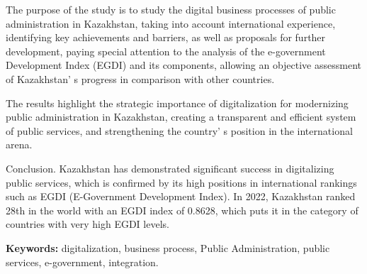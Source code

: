 The purpose of the study is to study the digital business processes of
public administration in Kazakhstan, taking into account international
experience, identifying key achievements and barriers, as well as
proposals for further development, paying special attention to the
analysis of the e-government Development Index (EGDI) and its
components, allowing an objective assessment of
Kazakhstan' s progress in comparison with other
countries.

The results highlight the strategic importance of digitalization for
modernizing public administration in Kazakhstan, creating a transparent
and efficient system of public services, and strengthening the
country' s position in the international arena.

Conclusion. Kazakhstan has demonstrated significant success in
digitalizing public services, which is confirmed by its high positions
in international rankings such as EGDI (E-Government Development Index).
In 2022, Kazakhstan ranked 28th in the world with an EGDI index of
0.8628, which puts it in the category of countries with very high EGDI
levels.

{\bfseries Keywords:} digitalization, business process, Public
Administration, public services, e-government, integration.

